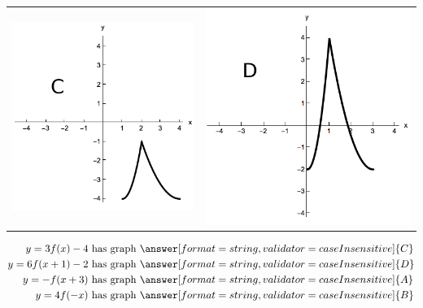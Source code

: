 \documentclass{ximera}
\begin{document}
\begin{exercise}
\begin{center}
\begin{tabular}{cc}
\includegraphics{transGraphC.png} & \includegraphics{transGraphD.png}
\end{tabular}
\end{center}
\begin{align*}
  y=3f(x)-4\text{ has graph }&\answer[format=string,validator=caseInsensitive]{C}\\
 y=6f(x+1)-2\text{ has graph }&\answer[format=string,validator=caseInsensitive]{D}\\
y=-f(x+3)\text{ has graph }&\answer[format=string,validator=caseInsensitive]{A}\\
 y=4f(-x)\text{ has graph }&\answer[format=string,validator=caseInsensitive]{B}
\end{align*}

\end{exercise}
\end{document}
